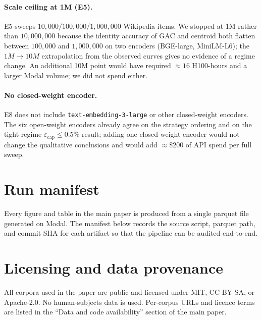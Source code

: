 \documentclass[11pt]{article}
\theoremstyle{definition}
\theoremstyle{remark}
\newcommand{\eps}{\varepsilon}
\begin{document}
\paragraph{Scale ceiling at 1M (E5).}
E5 sweeps $10{,}000 / 100{,}000 / 1{,}000{,}000$ Wikipedia items. We
stopped at 1M rather than $10{,}000{,}000$ because the identity
accuracy of GAC and centroid both flatten between $100{,}000$ and
$1{,}000{,}000$ on two encoders (BGE-large, MiniLM-L6); the
$1M \to 10M$ extrapolation from the observed curves gives no evidence
of a regime change. An additional 10M point would have required
$\approx 16$ H100-hours and a larger Modal volume; we did not spend
either.

\paragraph{No closed-weight encoder.}
E8 does not include \texttt{text-embedding-3-large} or other
closed-weight encoders. The six open-weight encoders already agree on
the strategy ordering and on the tight-regime $\eps_{\mathrm{cap}}
\leq 0.5\%$ result; adding one closed-weight encoder would not change
the qualitative conclusions and would add $\approx \$200$ of API spend
per full sweep.

\section{Run manifest}
\label{sec:supp:manifest}

Every figure and table in the main paper is produced from a single
parquet file generated on Modal. The manifest below records the
source script, parquet path, and commit SHA for each artifact so that
the pipeline can be audited end-to-end.



\section{Licensing and data provenance}

All corpora used in the paper are public and licensed under MIT,
CC-BY-SA, or Apache-2.0. No human-subjects data is used. Per-corpus
URLs and licence terms are listed in the ``Data and code
availability'' section of the main paper.



\end{document}
